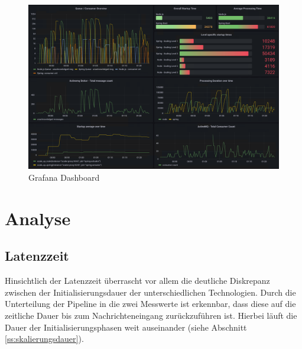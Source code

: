\begin{figure}[ht!]
	\centering
	\includegraphics[width=\linewidth]{kapitel/problemloesung/implementierung/_img/grafana-dashboard-01}
	\caption[]{Grafana Dashboard}
	\label{fig:grafanaScreenshot01}
\end{figure}


\section{Analyse}


\subsection{Latenzzeit}
Hinsichtlich der Latenzzeit überrascht vor allem die deutliche Diskrepanz zwischen der Initialisierungsdauer der unterschiedlichen Technologien. Durch die Unterteilung der Pipeline in die zwei Messwerte ist erkennbar, dass diese auf die zeitliche Dauer bis zum Nachrichteneingang zurückzuführen ist. Hierbei läuft die Dauer der Initialisierungsphasen weit auseinander (siehe Abschnitt \ref{ss:skalierungsdauer}).

